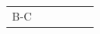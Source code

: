 {\begin{tabular}[t]{|l|l|l|l|l|l|}
        B-C &
         &
         &
         &
         &
     \tabularnewline\cline{1-1}\cline{2-2}\cline{3-3}\cline{4-4}\cline{5-5}\cline{6-6}
    \end{tabular}} %

